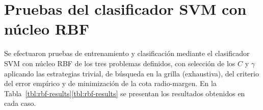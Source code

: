 %
%
%
\section{Pruebas del clasificador SVM con núcleo RBF}
%
Se efectuaron pruebas de entrenamiento y clasificación mediante el
clasificador SVM con núcleo RBF de los tres problemas definidos, con
selección de los  $C$ y $\gamma$ aplicando las estrategias
trivial, de búsqueda en la grilla (exhaustiva), del criterio del error
empírico y de minimización de la cota radio-margen.
En la \iflatexml{}Tabla~\ref{tbl:rbf-results}\else\autoref{tbl:rbf-results}\fi{}
se presentan los resultados obtenidos en cada caso.
